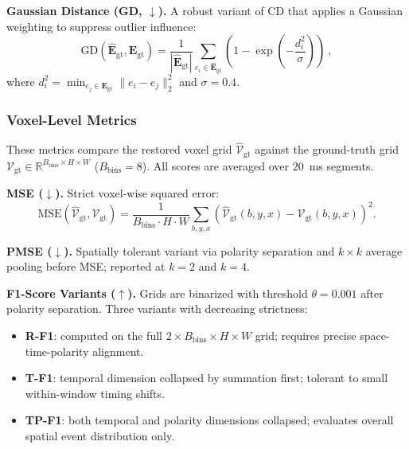     \noindent\textbf{Gaussian Distance (GD, $\downarrow$).}
    A robust variant of CD that applies a Gaussian weighting to suppress outlier influence:
    \begin{equation}
        \mathrm{GD}(\hat{\mathbf{E}}_{\mathrm{gt}}, \mathbf{E}_{\mathrm{gt}}) = \frac{1}{|\hat{\mathbf{E}}_{\mathrm{gt}}|} \sum_{e_i \in \hat{\mathbf{E}}_{\mathrm{gt}}} \left(1 - \exp\!\left(-\frac{d_i^2}{\sigma}\right)\right)~,
    \end{equation}
    where $d_i^2 = \min_{e_j \in \mathbf{E}_{\mathrm{gt}}} \|e_i - e_j\|_2^2$ and $\sigma = 0.4$.

    \subsubsection{Voxel-Level Metrics}
    These metrics compare the restored voxel grid $\hat{\mathcal{V}}_{\mathrm{gt}}$ against the ground-truth grid $\mathcal{V}_{\mathrm{gt}} \in \mathbb{R}^{B_\mathrm{bins} \times H \times W}$ ($B_\mathrm{bins}=8$). All scores are averaged over $20$~ms segments.

    \noindent\textbf{MSE ($\downarrow$).} Strict voxel-wise squared error:
    \begin{equation}
        \mathrm{MSE}(\hat{\mathcal{V}}_{\mathrm{gt}}, \mathcal{V}_{\mathrm{gt}}) = \frac{1}{B_\mathrm{bins} \cdot H \cdot W} \sum_{b,y,x} \!\left( \hat{\mathcal{V}}_{\mathrm{gt}}(b,y,x) - \mathcal{V}_{\mathrm{gt}}(b,y,x) \right)^2\!.
    \end{equation}

    \noindent\textbf{PMSE ($\downarrow$).} Spatially tolerant variant via polarity separation and $k \times k$ average pooling before MSE; reported at $k=2$ and $k=4$.

    \noindent\textbf{F1-Score Variants ($\uparrow$).} Grids are binarized with threshold $\theta=0.001$ after polarity separation. Three variants with decreasing strictness:
    \begin{itemize}
        \item \textbf{R-F1}: computed on the full $2 \times B_\mathrm{bins} \times H \times W$ grid; requires precise space-time-polarity alignment.
        \item \textbf{T-F1}: temporal dimension collapsed by summation first; tolerant to small within-window timing shifts.
        \item \textbf{TP-F1}: both temporal and polarity dimensions collapsed; evaluates overall spatial event distribution only.
    \end{itemize}


